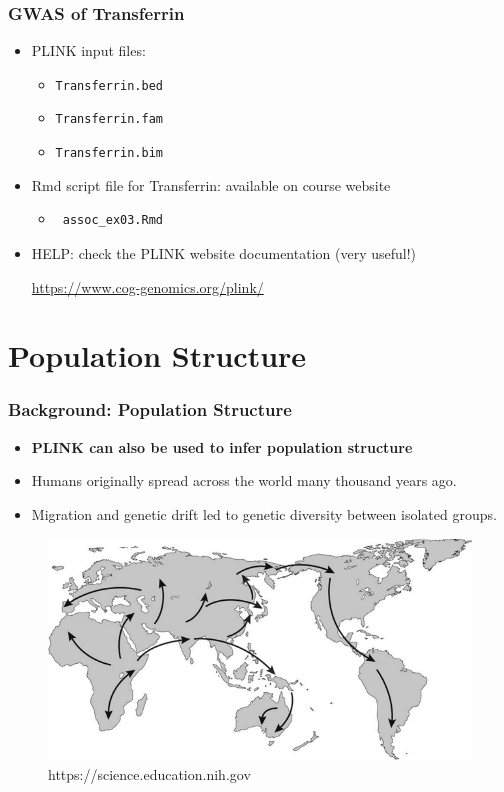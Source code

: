 \documentclass{beamer}
\begin{document}
\begin{frame}[fragile]
\frametitle{\bf GWAS of Transferrin}
\begin{itemize}
\item PLINK input files:
\begin{itemize}
\item {\tt Transferrin.bed}
\item {\tt Transferrin.fam}
\item {\tt Transferrin.bim}
\end{itemize}
\item  Rmd script file for Transferrin: available on course website
\begin{itemize}
\item \begin{verbatim} assoc_ex03.Rmd \end{verbatim}
 \end{itemize}
\item HELP: check the PLINK website documentation (very useful!)

\vspace{.3em}
\centering\url{https://www.cog-genomics.org/plink/}
\end{itemize}
\end{frame}


\section{Population Structure}

\begin{frame}
	\frametitle{Background:  Population Structure}
	\begin{itemize}
		\item \textbf{PLINK can also be used to infer population structure}
		\item Humans originally spread across the world many thousand years ago.
		\item Migration and genetic drift led to genetic diversity between isolated groups.
	\end{itemize}
	\begin{figure}
		\centering
		\includegraphics[scale=.40]{Figures/outofafrica.jpg}
		\caption{\scriptsize https://science.education.nih.gov}
	\end{figure}
	
\end{frame}
\end{document}
